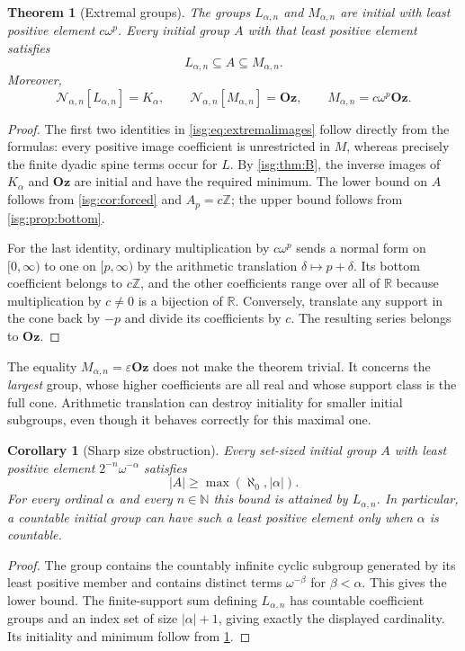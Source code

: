 \documentclass[11pt]{article}
\newtheorem{theorem}{Theorem}[section]
\newtheorem{corollary}[corollary]{Corollary}
\theoremstyle{definition}
\theoremstyle{remark}
\newcommand{\Oz}{\ensuremath{\mathbf{Oz}}}
\newcommand{\R}{\mathbb{R}}
\newcommand{\Z}{\mathbb{Z}}
\newcommand{\N}{\mathbb{N}}
\newcommand{\Rect}{\mathcal{N}_{\alpha,n}}
\begin{document}
\begin{theorem}[Extremal groups]\label{isg:thm:extremal}
The groups $L_{\alpha,n}$ and $M_{\alpha,n}$ are initial with least
positive element $c\omega^p$. Every initial group $A$ with that least
positive element satisfies
\[
 L_{\alpha,n}\subseteq A\subseteq M_{\alpha,n}.
\]
Moreover,
\begin{equation}\label{isg:eq:extremalimages}
 \Rect[L_{\alpha,n}]=K_\alpha,
 \qquad \Rect[M_{\alpha,n}]=\Oz,
 \qquad M_{\alpha,n}=c\omega^p\Oz.
\end{equation}
\end{theorem}
\begin{proof}
The first two identities in \eqref{isg:eq:extremalimages} follow directly
from the formulas: every positive image coefficient is unrestricted in
$M$, whereas precisely the finite dyadic spine terms occur for $L$.
By \cref{isg:thm:B}, the inverse images of $K_\alpha$ and $\Oz$ are
initial and have the required minimum. The lower bound on $A$ follows
from \cref{isg:cor:forced} and $A_p=c\Z$; the upper bound follows from
\cref{isg:prop:bottom}.

For the last identity, ordinary multiplication by $c\omega^p$ sends a
normal form on $[0,\infty)$ to one on $[p,\infty)$ by the arithmetic
translation $\delta\mapsto p+\delta$. Its bottom coefficient belongs
to $c\Z$, and the other coefficients range over all of $\R$ because
multiplication by $c\ne0$ is a bijection of $\R$. Conversely, translate
any support in the cone back by $-p$ and divide its coefficients by $c$.
The resulting series belongs to $\Oz$.
\end{proof}

The equality $M_{\alpha,n}=\varepsilon\Oz$ does not make the theorem
trivial. It concerns the \emph{largest} group, whose higher coefficients
are all real and whose support class is the full cone. Arithmetic
translation can destroy initiality for smaller initial subgroups, even
though it behaves correctly for this maximal one.

\begin{corollary}[Sharp size obstruction]\label{isg:cor:size}
Every set-sized initial group $A$ with least positive element
$2^{-n}\omega^{-\alpha}$ satisfies
\[
 |A|\ge\max(\aleph_0,|\alpha|).
\]
For every ordinal $\alpha$ and every $n\in\N$ this bound is attained
by $L_{\alpha,n}$. In particular, a countable initial group can have
such a least positive element only when $\alpha$ is countable.
\end{corollary}
\begin{proof}
The group contains the countably infinite cyclic subgroup generated by
its least positive member and contains distinct terms $\omega^{-\beta}$
for $\beta<\alpha$. This gives the lower bound. The finite-support
sum defining $L_{\alpha,n}$ has countable coefficient groups and an
index set of size $|\alpha|+1$, giving exactly the displayed cardinality.
Its initiality and minimum follow from \cref{isg:thm:extremal}.
\end{proof}
\end{document}
